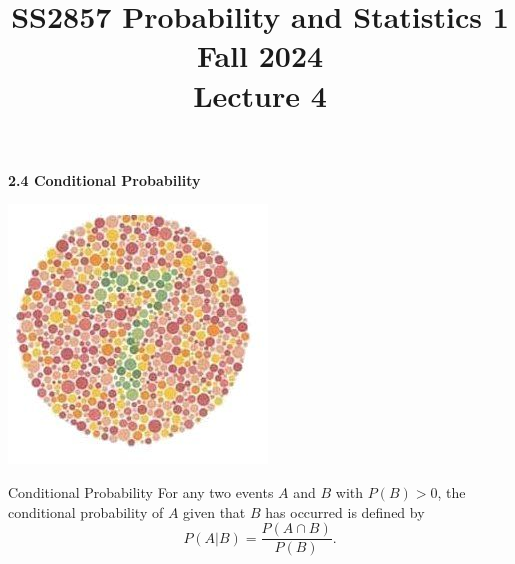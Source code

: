 \documentclass[aspectratio=169,xcolor=pdftex,dvipsnames,table]{beamer}\usepackage[]{graphicx}\usepackage[]{xcolor}
\title[SS2857 -- Lecture 4]{SS2857 Probability and Statistics 1\\
  Fall 2024\\
  \vspace{.2in}
  Lecture 4}
\date{}
\begin{document}
{

\begin{frame}
  \maketitle
\end{frame}
}

\begin{frame}
  \begin{center}
    \Large{\textbf{2.4 Conditional Probability}}

    \includegraphics[height = .6\textheight]{colorblind-test-image1.jpg}
  \end{center}
\end{frame}

\begin{frame}{Conditional Probability}
  For any two events $A$ and $B$ with $P(B)>0$, the conditional probability of $A$ given that $B$ has occurred is defined by
  \[
    P(A|B)=\frac{P(A \cap B)}{P(B)}.
  \]
\end{frame}
\end{document}
